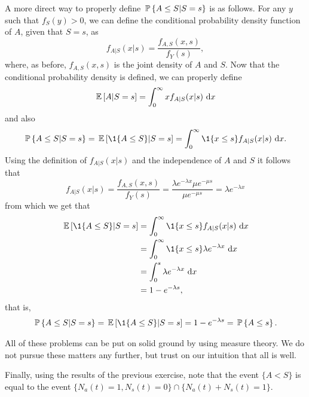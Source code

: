 \begin{question}
\begin{solution}
A more direct way to properly define $\P{A\leq S| S=s}$ is as follows. For any $y$ such that $f_S(y) > 0$, we can define the conditional probability density function of $A$, given that $S=s$, as 
\begin{equation*}
  f_{A|S}(x|s) = \frac{f_{A, S}( x, s)}{f_Y(s)},
\end{equation*}
where, as before, $f_{A, S}( x, s)$ is the joint density of $A$ and $S$. Now that the conditional probability density is defined, we can properly define
\begin{equation*}
  \E {A| S=s } = \int_0^\infty x   f_{A|S}(x|s)\, \d x
\end{equation*}
and also
\begin{equation*}
  \begin{split}
  \P{A\leq S| S=s } = \E{\1{A \leq S}| S=s } = \int_0^\infty \1{x \leq s}   f_{A|S}(x|s)\, \d x.
  \end{split}
\end{equation*}
Using the definition of $f_{A|S}(x|s)$ and the independence of $A$ and $S$ it follows that
\begin{equation*}
  f_{A|S}(x|s) = \frac{f_{A, S}( x, s)}{f_Y(s)} = \frac{\lambda e^{-\lambda x} \mu e^{-\mu s}}{\mu e^{-\mu s}} = \lambda e^{-\lambda x}
\end{equation*}
from which we get that 
\begin{equation*}
  \begin{split}
  \E{\1{A \leq S}| S=s } 
&= \int_0^\infty \1{x \leq s}   f_{A|S}(x|s)\, \d x \\
&= \int_0^\infty \1{x \leq s} \lambda e^{-\lambda x}\, \d x \\
&= \int_0^s \lambda e^{-\lambda x}\, \d x \\
&= 1 - e^{-\lambda s},
  \end{split}
\end{equation*}
that is,
\begin{equation*}
  \begin{split}
  \P{A\leq S| S=s} = \E{\1{A \leq S}| S=s } = 1 - e^{-\lambda s}  = \P{A \leq s}.
  \end{split}
\end{equation*}

All of these problems can be put on solid ground by using measure
theory. We do not pursue these matters any further, but trust on our
intuition that all is well.


Finally, using the results of the previous exercise, note that the
event $\{A<S\}$ is equal to the event
$\{N_a(t) = 1, N_s(t)=0\}\cap\{N_a(t) + N_s(t)=1\}$. 

\end{solution}
\end{question}


